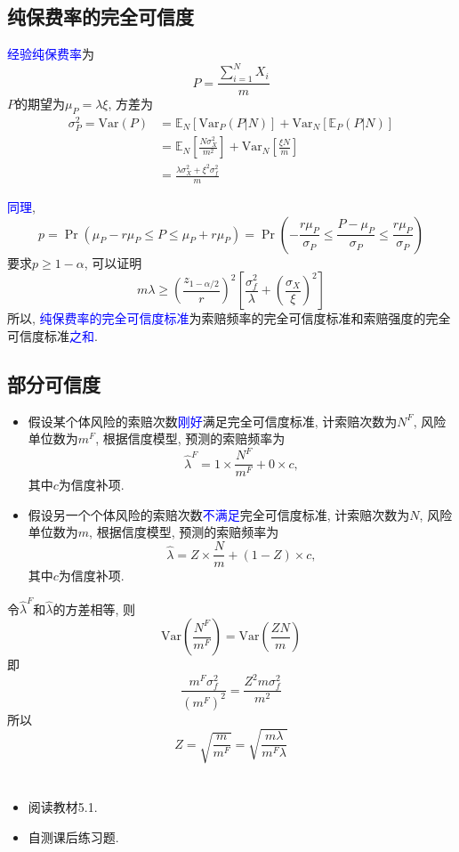 \documentclass[professionalfont]{beamer}
\def\E{{\mathbb E}}  %
\newcommand{\blue}[1]{\textcolor{blue}{#1}}
\begin{document}
\subsection{纯保费率的完全可信度}
\begin{frame}
\blue{经验纯保费率}为
$$P=\frac{\sum_{i=1}^N X_i}{m}$$
$P$的期望为$\mu_P=\lambda\xi$, 方差为
\begin{equation}\label{pure}
\begin{aligned}
\sigma^2_P=\text{Var}(P)&=\E_N\left[\text{Var}_P(P|N)\right]+\text{Var}_N\left[\E_P(P|N)\right]\\&=\E_N\left[\frac{N\sigma^2_X}{m^2}\right]+\text{Var}_N\left[\frac{\xi N}{m}\right]\\
&=\frac{\lambda\sigma^2_X+\xi^2\sigma^2_f}{m}
\end{aligned}
\end{equation}
\end{frame}

\begin{frame}
\blue{同理}, 
$$p=\Pr(\mu_P-r\mu_P\le P \le\mu_P+r\mu_P)=\Pr\left(-\frac{r\mu_P}{\sigma_P}\le \frac{P-\mu_P}{\sigma_P} \le \frac{r\mu_P}{\sigma_P}\right)$$
要求$p\geq1-\alpha$, 可以证明
$$m\lambda\geq\left(\frac{z_{1-\alpha/2}}{r}\right)^2\left[\frac{\sigma^2_f}{\lambda}+\left(\frac{\sigma_X}{\xi}\right)^2\right]$$
所以, \blue{纯保费率的完全可信度标准}为索赔频率的完全可信度标准和索赔强度的完全可信度标准\blue{之和}.
\end{frame}

\subsection{部分可信度}
\begin{frame}
\begin{itemize}
\item 假设某个体风险的索赔次数\blue{刚好}满足完全可信度标准, 计索赔次数为$N^F$, 风险单位数为$m^F$, 根据信度模型, 预测的索赔频率为
$$\hat{\lambda}^F=1\times\frac{N^F}{m^F}+0\times c,$$
其中$c$为信度补项.
\item 假设另一个个体风险的索赔次数\blue{不满足}完全可信度标准, 计索赔次数为$N$, 风险单位数为$m$, 根据信度模型, 预测的索赔频率为
$$\hat{\lambda}=Z\times\frac{N}{m}+(1-Z)\times c,$$
其中$c$为信度补项.
\end{itemize}
\end{frame}

\begin{frame}

令$\hat{\lambda}^F$和$\hat{\lambda}$的方差相等, 则
$$\text{Var}\left(\frac{N^F}{m^F}\right)=\text{Var}\left(\frac{ZN}{m}\right)$$
即
$$\frac{m^F\sigma^2_f}{(m^F)^2}=\frac{Z^2m\sigma^2_f}{m^2}$$
所以
$$Z=\sqrt{\frac{m}{m^F}}=\sqrt{\frac{m\lambda}{m^F\lambda}}$$
\end{frame}

\section*{}
\begin{frame}
\begin{itemize}
\item 阅读教材5.1.
\item 自测课后练习题.
\end{itemize}
\end{frame}
\end{document}
